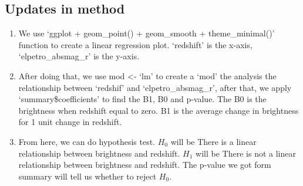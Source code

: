 \documentclass[12pt]{article}
\begin{document}
\subsection{Updates in method}
\begin{enumerate}
	\item We use `ggplot + geom\_point() + geom\_smooth + theme\_minimal()' function to create a linear regression plot. `redshift' is the x-axis, `elpetro\_absmag\_r' is the y-axis.
	\item After doing that, we use mod <- `lm' to create a `mod' the analysis the relationship between `redshif' and `elpetro\_absmag\_r', after that, we apply `summary\$coefficients' to find the B1, B0 and p-value. The B0 is the brightness when redshift equal to zero. B1 is the average change in brightness for 1 unit change in redshift.
	\item From here, we can do hypothesis test. $H_0$ will be There is a linear relationship between brightness and redshift. $H_1$ will be There is not a linear relationship between brightness and redshift. The p-value we got form summary will tell us whether to reject $H_0$.
\end{enumerate}



\newpage
\end{document}
